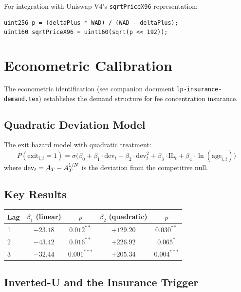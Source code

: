 \begin{remark}
For integration with Uniswap V4's \texttt{sqrtPriceX96} representation:
\begin{verbatim}
uint256 p = (deltaPlus * WAD) / (WAD - deltaPlus);
uint160 sqrtPriceX96 = uint160(sqrt(p << 192));
\end{verbatim}
\end{remark}

\section{Econometric Calibration}\label{sec:econometric}

The econometric identification (see companion document \texttt{lp-insurance-demand.tex})
establishes the demand structure for fee concentration insurance.

\subsection{Quadratic Deviation Model}

The exit hazard model with quadratic treatment:
\begin{equation}\label{eq:quadratic-hazard}
  P(\text{exit}_{i,t} = 1) = \sigma\bigl(
    \beta_0 + \beta_1 \cdot \text{dev}_t + \beta_2 \cdot \text{dev}_t^2
    + \beta_3 \cdot \text{IL}_t + \beta_4 \cdot \ln(\text{age}_{i,t})
  \bigr)
\end{equation}
where $\text{dev}_t = A_T - A_T^{1/N}$ is the deviation from the competitive null.

\subsection{Key Results}

\begin{center}
\begin{tabular}{@{}lcccc@{}}
\toprule
Lag & $\beta_1$ (linear) & $p$ & $\beta_2$ (quadratic) & $p$ \\
\midrule
1 & $-23.18$ & $0.012^{**}$ & $+129.20$ & $0.030^{**}$ \\
2 & $-43.42$ & $0.016^{**}$ & $+226.92$ & $0.065^{*}$ \\
3 & $-32.44$ & $0.001^{***}$ & $+205.34$ & $0.004^{***}$ \\
\bottomrule
\end{tabular}
\end{center}

\subsection{Inverted-U and the Insurance Trigger}

